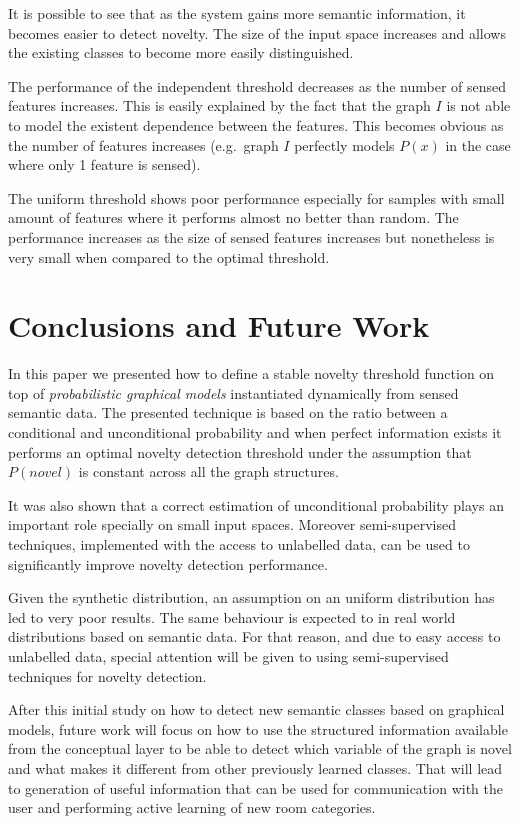 \documentclass[runningheads,a4paper]{llncs}
\begin{document}
It is possible to see that as the system gains more semantic information, it
becomes easier to detect novelty. The size of the input space increases and allows the
existing classes to become more easily distinguished.

The performance of the independent threshold decreases as the number of sensed
features increases. This is easily explained by the fact that the graph $I$ is not
able to model the existent dependence between the features. This becomes obvious
as the number of features increases (e.g.\ graph $I$ perfectly models $P(x)$ in the
case where only 1 feature is sensed).

The uniform threshold shows poor performance especially for samples with small amount of features
where it performs almost no better than random.
The performance increases as the size of sensed features increases but nonetheless
is very small when compared to the optimal threshold.


\section{Conclusions and Future Work}
\label{sec:conclusion}
In this paper we presented how to define a stable novelty threshold function on
top of \emph{probabilistic graphical models} instantiated dynamically from sensed
semantic data.
The presented technique is based on the ratio between a conditional and
unconditional probability and when perfect information exists it performs an optimal
novelty detection threshold under the assumption that $P(novel)$ is constant across
all the graph structures.

It was also shown that a correct estimation of unconditional probability plays an
important role specially on small input spaces. Moreover semi-supervised techniques,
implemented with the access to unlabelled data, can be used to significantly improve
novelty detection performance.

Given the synthetic distribution, an assumption on an uniform
distribution has led to very poor results. The same behaviour is expected to
in real world distributions based on semantic data. For that reason,
and due to easy access to unlabelled data, special attention will be given to using
semi-supervised techniques for novelty detection.

After this initial study on how to detect new semantic classes based on
graphical models, future work will focus on how to use the structured
information available from the conceptual layer to be able to detect which variable
of the graph is novel and what makes it different from other previously learned
classes. That will lead to generation of useful information that can be used for
communication with the user and performing active learning of new room categories.




\end{document}

